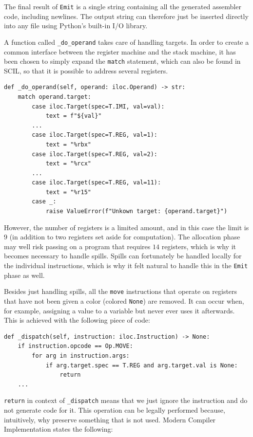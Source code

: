 The final result of \texttt{Emit} is a single string containing all the generated assembler code, including newlines. The output string can therefore just be inserted directly into any file using Python's built-in I/O library.

A function called \texttt{\_do\_operand} takes care of handling targets. In order to create a common interface between the register machine and the stack machine, it has been chosen to simply expand the \texttt{match} statement, which can also be found in SCIL, so that it is possible to address several registers.

\begin{verbatim}
def _do_operand(self, operand: iloc.Operand) -> str:
    match operand.target:
        case iloc.Target(spec=T.IMI, val=val):
            text = f"${val}"
        ...
        case iloc.Target(spec=T.REG, val=1):
            text = "%rbx"
        case iloc.Target(spec=T.REG, val=2):
            text = "%rcx"
        ...
        case iloc.Target(spec=T.REG, val=11):
            text = "%r15"
        case _:
            raise ValueError(f"Unkown target: {operand.target}")
\end{verbatim}

However, the number of registers is a limited amount, and in this case the limit is $9$ (in addition to two registers set aside for computation). The allocation phase may well risk passing on a program that requires $14$ registers, which is why it becomes necessary to handle spills. Spills can fortunately be handled locally for the individual instructions, which is why it felt natural to handle this in the \texttt{Emit} phase as well.

Besides just handling spills, all the \texttt{move} instructions that operate on registers that have not been given a color (colored \texttt{None}) are removed. It can occur when, for example, assigning a value to a variable but never ever uses it afterwards. This is achieved with the following piece of code:

\begin{verbatim}
def _dispatch(self, instruction: iloc.Instruction) -> None:
    if instruction.opcode == Op.MOVE:
        for arg in instruction.args:
            if arg.target.spec == T.REG and arg.target.val is None:
                return
    ...
\end{verbatim}

\texttt{return} in context of \texttt{\_dispatch} means that we just ignore the instruction and do not generate code for it. This operation can be legally performed because, intuitively, why preserve something that is not used. Modern Compiler Implementation states the following:

